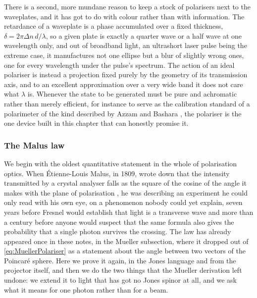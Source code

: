        There is a second, more mundane reason to keep a stock of polarisers next to the waveplates, and it has got to do with colour rather than with information. The retardance of a waveplate is a phase accumulated over a fixed thickness, $\delta=2\pi\Delta n\,d/\lambda$, so a given plate is exactly a quarter wave or a half wave at one wavelength only, and out of broadband light, an ultrashort laser pulse being the extreme case, it manufactures not one ellipse but a blur of slightly wrong ones, one for every wavelength under the pulse's spectrum. The action of an ideal polariser is instead a projection fixed purely by the geometry of its transmission axis, and to an excellent approximation over a very wide band it does not care what $\lambda$ is. Whenever the state to be generated must be pure and achromatic rather than merely efficient, for instance to serve as the calibration standard of a polarimeter of the kind described by Azzam and Bashara \citep{azzam1977ellipsometry}, the polariser is the one device built in this chapter that can honestly promise it.

        \subsubsection{The Malus law}

            We begin with the oldest quantitative statement in the whole of polarisation optics. When Étienne-Louis Malus, in 1809, wrote down that the intensity transmitted by a crystal analyser falls as the square of the cosine of the angle it makes with the plane of polarisation \citep{malus1809theorie}, he was describing an experiment he could only read with his own eye, on a phenomenon nobody could yet explain, seven years before Fresnel would establish that light is a transverse wave and more than a century before anyone would suspect that the same formula also gives the probability that a single photon survives the crossing. The law has already appeared once in these notes, in the Mueller subsection, where it dropped out of \ref{eq:MuellerPolariser} as a statement about the angle between two vectors of the Poincaré sphere. Here we prove it again, in the Jones language and from the projector itself, and then we do the two things that the Mueller derivation left undone: we extend it to light that has got no Jones spinor at all, and we ask what it means for one photon rather than for a beam.

